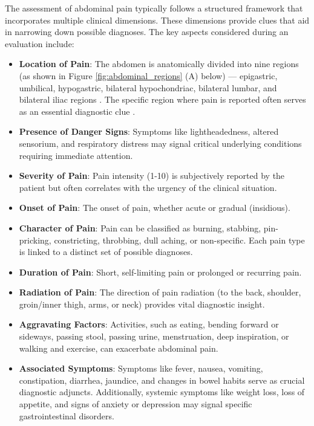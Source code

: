 \noindent The assessment of abdominal pain typically follows a structured framework that incorporates multiple clinical dimensions. These dimensions provide clues that aid in narrowing down possible diagnoses. The key aspects considered during an evaluation include:
\begin{itemize}
    \item \textcolor{TUMRed}{\textbf{Location of Pain}}: The abdomen is anatomically divided into nine regions (as shown in Figure \ref{fig:abdominal_regions} (A) below) --- epigastric, umbilical, hypogastric, bilateral hypochondriac, bilateral lumbar, and bilateral iliac regions \cite{AbExm}. The specific region where pain is reported often serves as an essential diagnostic clue \cite{gans2015guideline}.
    \item \textcolor{TUMRed}{\textbf{Presence of Danger Signs}}: Symptoms like lightheadedness, altered sensorium, and respiratory distress may signal critical underlying conditions requiring immediate attention.
    \item \textcolor{TUMRed}{\textbf{Severity of Pain}}: Pain intensity (1-10) is subjectively reported by the patient but often correlates with the urgency of the clinical situation.
    \item \textcolor{TUMRed}{\textbf{Onset of Pain}}: The onset of pain, whether acute or gradual (insidious).
    \item \textcolor{TUMRed}{\textbf{Character of Pain}}: Pain can be classified as burning, stabbing, pin-pricking, constricting, throbbing, dull aching, or non-specific. Each pain type is linked to a distinct set of possible diagnoses.
    \item \textcolor{TUMRed}{\textbf{Duration of Pain}}: Short, self-limiting pain or prolonged or recurring pain.
    \item \textcolor{TUMRed}{\textbf{Radiation of Pain}}: The direction of pain radiation (to the back, shoulder, groin/inner thigh, arms, or neck) provides vital diagnostic insight.
    \item \textcolor{TUMRed}{\textbf{Aggravating Factors}}: Activities, such as eating, bending forward or sideways, passing stool, passing urine, menstruation, deep inspiration, or walking and exercise, can exacerbate abdominal pain.
    \item \textcolor{TUMRed}{\textbf{Associated Symptoms}}: Symptoms like fever, nausea, vomiting, constipation, diarrhea, jaundice, and changes in bowel habits serve as crucial diagnostic adjuncts. Additionally, systemic symptoms like weight loss, loss of appetite, and signs of anxiety or depression may signal specific gastrointestinal disorders.

\end{itemize}
